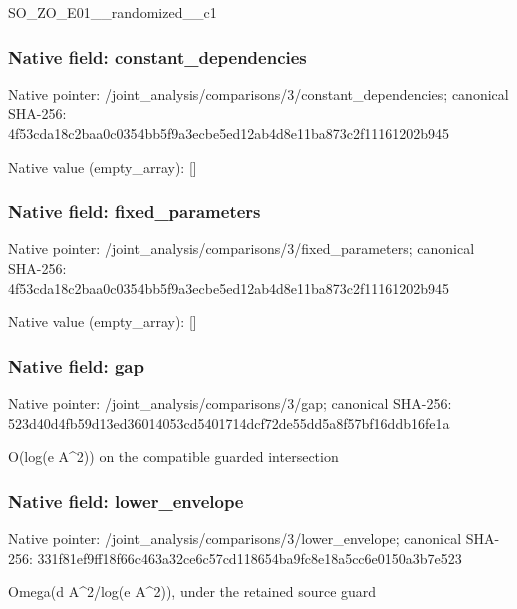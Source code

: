 \documentclass[10pt,a4paper]{article}
\begin{document}
\begingroup\raggedright\sloppy SO\_\allowbreak{}ZO\_\allowbreak{}E01\_\allowbreak{}\_\allowbreak{}randomized\_\allowbreak{}\_\allowbreak{}c1\par\endgroup

\subsubsection{Native field: constant\_\allowbreak{}dependencies}
Native pointer: /joint\_\allowbreak{}analysis/comparisons/3/constant\_\allowbreak{}dependencies; canonical SHA-256: 4f53cda18c2baa0c0354bb5f9a3ecbe5ed12ab4d8e11ba873c2f11161202b945

Native value (empty\_\allowbreak{}array): []

\subsubsection{Native field: fixed\_\allowbreak{}parameters}
Native pointer: /joint\_\allowbreak{}analysis/comparisons/3/fixed\_\allowbreak{}parameters; canonical SHA-256: 4f53cda18c2baa0c0354bb5f9a3ecbe5ed12ab4d8e11ba873c2f11161202b945

Native value (empty\_\allowbreak{}array): []

\subsubsection{Native field: gap}
Native pointer: /joint\_\allowbreak{}analysis/comparisons/3/gap; canonical SHA-256: 523d40d4fb59d13ed36014053cd5401714dcf72de55dd5a8f57bf16ddb16fe1a

\begingroup\raggedright\sloppy O(log(e A\textasciicircum{}2)) on the compatible guarded intersection\par\endgroup

\subsubsection{Native field: lower\_\allowbreak{}envelope}
Native pointer: /joint\_\allowbreak{}analysis/comparisons/3/lower\_\allowbreak{}envelope; canonical SHA-256: 331f81ef9ff18f66c463a32ce6c57cd118654ba9fc8e18a5cc6e0150a3b7e523

\begingroup\raggedright\sloppy Omega(d A\textasciicircum{}2/\allowbreak{}log(e A\textasciicircum{}2)),\allowbreak{} under the retained source guard\par\endgroup
\end{document}
